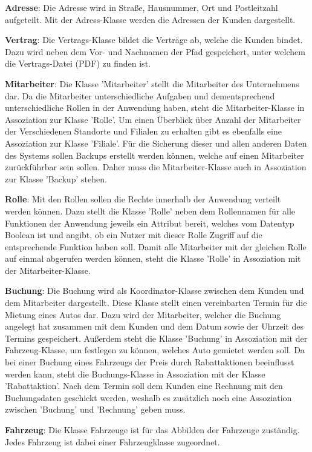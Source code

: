 \textbf{Adresse}: Die Adresse wird in Straße, Hausnummer, Ort und Postleitzahl aufgeteilt. Mit der Adress-Klasse werden die Adressen der Kunden dargestellt.

\textbf{Vertrag}: Die Vertrags-Klasse bildet die Verträge ab, welche die Kunden bindet. Dazu wird neben dem Vor- und Nachnamen der Pfad gespeichert, unter welchem die Vertrags-Datei (PDF) zu finden ist.

\textbf{Mitarbeiter}: Die Klasse 'Mitarbeiter' stellt die Mitarbeiter des Unternehmens dar. Da die Mitarbeiter unterschiedliche Aufgaben und dementsprechend unterschiedliche Rollen in der Anwendung haben, steht die Mitarbeiter-Klasse in Assoziation zur Klasse 'Rolle'. Um einen Überblick über Anzahl der Mitarbeiter der Verschiedenen Standorte und Filialen zu erhalten gibt es ebenfalls eine Assoziation zur Klasse 'Filiale'. Für die Sicherung dieser und allen anderen Daten des Systems sollen Backups erstellt werden können, welche auf einen Mitarbeiter zurückführbar sein sollen. Daher muss die Mitarbeiter-Klasse auch in Assoziation zur Klasse 'Backup' stehen.

\textbf{Rolle}: Mit den Rollen sollen die Rechte innerhalb der Anwendung verteilt werden können. Dazu stellt die Klasse 'Rolle' neben dem Rollennamen für alle Funktionen der Anwendung jeweils ein Attribut bereit, welches vom Datentyp Boolean ist und angibt, ob ein Nutzer mit dieser Rolle Zugriff auf die entsprechende Funktion haben soll. Damit alle Mitarbeiter mit der gleichen Rolle auf einmal abgerufen werden können, steht die Klasse 'Rolle' in Assoziation mit der Mitarbeiter-Klasse.

\textbf{Buchung}: Die Buchung wird als Koordinator-Klasse zwischen dem Kunden und dem Mitarbeiter dargestellt. Diese Klasse stellt einen vereinbarten Termin für die Mietung eines Autos dar. Dazu wird der Mitarbeiter, welcher die Buchung angelegt hat zusammen mit dem Kunden und dem Datum sowie der Uhrzeit des Termins gespeichert. Außerdem steht die Klasse 'Buchung' in Assoziation mit der Fahrzeug-Klasse, um festlegen zu können, welches Auto gemietet werden soll. Da bei einer Buchung eines Fahrzeugs der Preis durch Rabattaktionen beeinflusst werden kann, steht die Buchungs-Klasse in Assoziation mit der Klasse 'Rabattaktion'. Nach dem Termin soll dem Kunden eine Rechnung mit den Buchungsdaten geschickt werden, weshalb es zusätzlich noch eine Assoziation zwischen 'Buchung' und 'Rechnung' geben muss.

\textbf{Fahrzeug}: Die Klasse Fahrzeuge ist für das Abbilden der Fahrzeuge zuständig. Jedes Fahrzeug ist dabei einer Fahrzeugklasse zugeordnet.

